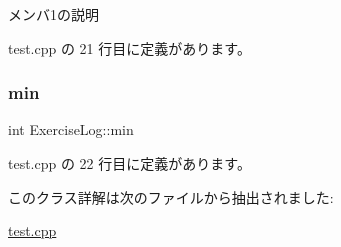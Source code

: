 メンバ1の説明 

 test.\+cpp の 21 行目に定義があります。

\mbox{\label{class_exercise_log_a9fc8d465bb5d443970799bafd82441a4}} 
\subsubsection{\texorpdfstring{min}{min}}
{\footnotesize\ttfamily int Exercise\+Log\+::min\hspace{0.3cm}{\ttfamily [private]}}



 test.\+cpp の 22 行目に定義があります。



このクラス詳解は次のファイルから抽出されました\+:\begin{DoxyCompactItemize}
\item 
\hyperlink{test_8cpp}{test.\+cpp}\end{DoxyCompactItemize}
